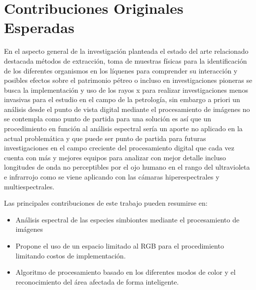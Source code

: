 \chapter{Contribuciones Originales Esperadas}

En el aspecto general de la investigación planteada el estado del arte relacionado destacada métodos de extracción, toma de muestras físicas para la identificación de los diferentes organismos en los líquenes para comprender su interacción y posibles efectos sobre el patrimonio pétreo o incluso en investigaciones pioneras se busca la implementación y uso de los rayos x para realizar investigaciones menos invasivas para el estudio en el campo de la petrología, sin embargo a priori un análisis desde el punto de vista digital mediante el procesamiento de imágenes no se contempla como punto de partida para una solución es así que un procedimiento en función al análisis espectral sería un aporte no aplicado en la actual problemática y que puede ser punto de partida para futuras investigaciones en el campo creciente del procesamiento digital que cada vez cuenta con más y mejores equipos para analizar con mejor detalle incluso longitudes de onda no perceptibles por el ojo humano en el rango del ultravioleta e infrarrojo como se viene aplicando con las cámaras hiperespectrales y multiespectrales.


Las principales contribuciones de este trabajo pueden resumirse en:

 \begin{itemize}
 	
	\item Análisis espectral de las especies simbiontes mediante el procesamiento de imágenes
	
	\item Propone el uso de un espacio limitado al RGB para el procedimiento limitando costos de implementación.
	
	\item Algoritmo de procesamiento basado en los diferentes modos de color y el reconocimiento del área afectada de forma inteligente.
	
 \end{itemize}
